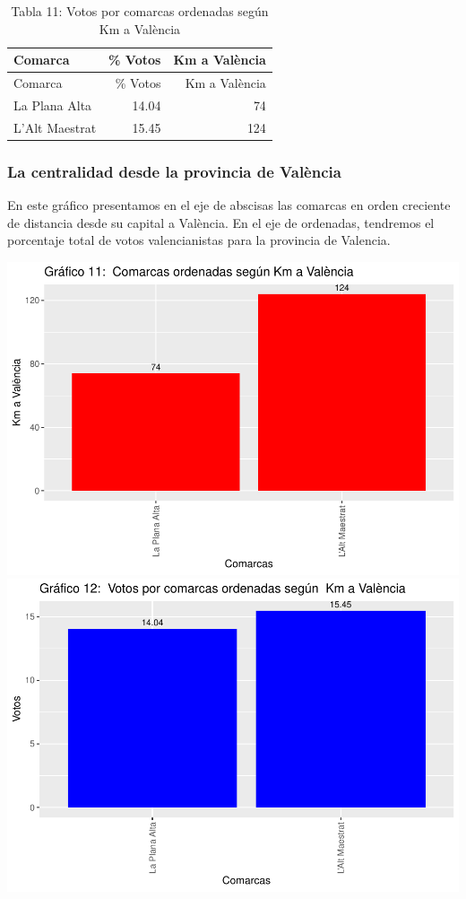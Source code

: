 \documentclass[
]{article}
\begin{document}
\begin{longtable}[]{@{}lrr@{}}
\caption{Tabla 11: Votos por comarcas ordenadas según Km a
València}\tabularnewline
\toprule\noalign{}
Comarca & \% Votos & Km a València \\
\midrule\noalign{}
\endfirsthead
\toprule\noalign{}
Comarca & \% Votos & Km a València \\
\midrule\noalign{}
\endhead
\bottomrule\noalign{}
\endlastfoot
La Plana Alta & 14.04 & 74 \\
L'Alt Maestrat & 15.45 & 124 \\
\end{longtable}

\hypertarget{la-centralidad-desde-la-provincia-de-valuxe8ncia}{%
\subsubsection{La centralidad desde la provincia de
València}\label{la-centralidad-desde-la-provincia-de-valuxe8ncia}}

En este gráfico presentamos en el eje de abscisas las comarcas en orden
creciente de distancia desde su capital a València. En el eje de
ordenadas, tendremos el porcentaje total de votos valencianistas para la
provincia de Valencia.

\includegraphics{votovalencianista-ea2023_files/figure-latex/ordenDistanciacapitalValencia-1.pdf}
\includegraphics{votovalencianista-ea2023_files/figure-latex/ordenDistanciacapitalValencia-2.pdf}
\end{document}
